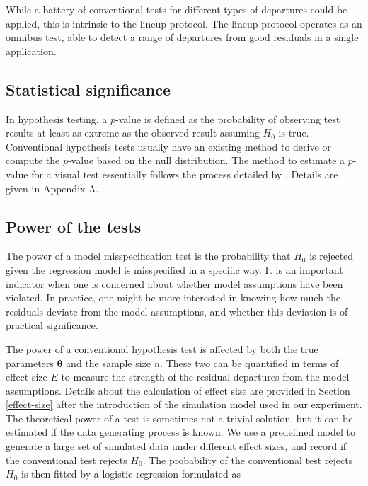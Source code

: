 \documentclass[]{interact}
\theoremstyle{plain}%
\theoremstyle{definition}
\theoremstyle{remark}
\begin{document}
While a battery of conventional tests for different types of departures
could be applied, this is intrinsic to the lineup protocol. The lineup
protocol operates as an omnibus test, able to detect a range of
departures from good residuals in a single application.

\hypertarget{statistical-significance}{%
\subsection{\texorpdfstring{Statistical
significance\label{sig}}{Statistical significance}}\label{statistical-significance}}

In hypothesis testing, a \(p\)-value is defined as the probability of
observing test results at least as extreme as the observed result
assuming \(H_0\) is true. Conventional hypothesis tests usually have an
existing method to derive or compute the \(p\)-value based on the null
distribution. The method to estimate a \(p\)-value for a visual test
essentially follows the process detailed by
\citet{vanderplas2021statistical}. Details are given in Appendix A.

\hypertarget{power-of-the-tests}{%
\subsection{Power of the tests}\label{power-of-the-tests}}

The power of a model misspecification test is the probability that
\(H_0\) is rejected given the regression model is misspecified in a
specific way. It is an important indicator when one is concerned about
whether model assumptions have been violated. In practice, one might be
more interested in knowing how much the residuals deviate from the model
assumptions, and whether this deviation is of practical significance.

The power of a conventional hypothesis test is affected by both the true
parameters \(\boldsymbol{\theta}\) and the sample size \(n\). These two
can be quantified in terms of effect size \(E\) to measure the strength
of the residual departures from the model assumptions. Details about the
calculation of effect size are provided in Section \ref{effect-size}
after the introduction of the simulation model used in our experiment.
The theoretical power of a test is sometimes not a trivial solution, but
it can be estimated if the data generating process is known. We use a
predefined model to generate a large set of simulated data under
different effect sizes, and record if the conventional test rejects
\(H_0\). The probability of the conventional test rejects \(H_0\) is
then fitted by a logistic regression formulated as
\end{document}
